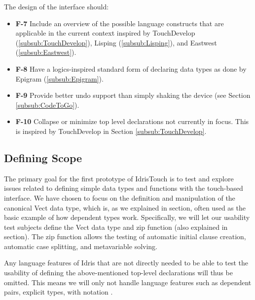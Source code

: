 The design of the interface should:

\begin{itemize}     
	\item \textbf{F-7} Include an overview of the possible language constructs that are
	applicable in the current context inspired by TouchDevelop (\ref{subsub:TouchDevelop}), Lisping
	(\ref{subsub:Lisping}), and Eastwest (\ref{subsub:Eastwest}).
	\item \textbf{F-8} Have a logics-inspired standard form of declaring data types as done by Epigram
	(\ref{subsub:Epigram}).
	\item \textbf{F-9} Provide better undo support than simply shaking the device (see Section
	\ref{subsub:CodeToGo}).
	\item \textbf{F-10} Collapse or minimize top level declarations not currently in focus. This is inspired by TouchDevelop
	in Section \ref{subsub:TouchDevelop}.
\end{itemize}


\subsection{Defining Scope} 
The primary goal for the first prototype of IdrisTouch is to test and explore
issues related to defining simple data types and functions with the touch-based interface. 
We have chosen to focus on the definition and manipulation of the canonical Vect data type, which is, as we explained in
section, often used as the basic example of how dependent types
work. Specifically, we will let our usability test subjects define the Vect data type and zip
function (also explained in section). The zip function allows the
testing of automatic initial clause creation, automatic case splitting, and metavariable solving.

Any language features of Idris that are not directly needed to be able to test
the usability of defining the above-mentioned top-level declarations will thus
be omitted. This means we will only not handle language features such as
dependent pairs, explicit types, with notation .









